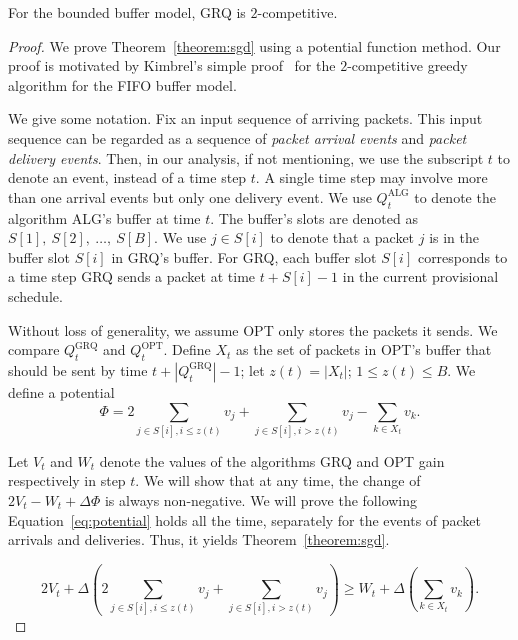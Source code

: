 \documentclass[final, 11pt]{article}
\begin{document}
\begin{theorem}
For the bounded buffer model, GRQ is $2$-competitive.
\label{theorem:sgd}
\end{theorem}

\begin{proof}
We prove Theorem~\ref{theorem:sgd} using a potential function method. Our proof is motivated by Kimbrel's simple proof~\cite{K04} for the $2$-competitive greedy algorithm for the FIFO buffer model.

We give some notation. Fix an input sequence of arriving packets. This input sequence can be regarded as a sequence of {\em packet arrival events} and {\em packet delivery events}. Then, in our analysis, if not mentioning, we use the subscript $t$ to denote an event, instead of a time step $t$. A single time step may involve more than one arrival events but only one delivery event. We use $Q^\text{ALG}_t$ to denote the algorithm ALG's buffer at time $t$. The buffer's slots are denoted as $S[1], \ S[2], \ \ldots, \ S[B]$. We use $j \in S[i]$ to denote that a packet $j$ is in the buffer slot $S[i]$ in GRQ's buffer. For GRQ, each buffer slot $S[i]$ corresponds to a time step GRQ sends a packet at time $t + S[i] - 1$ in the current provisional schedule.

Without loss of generality, we assume OPT only stores the packets it sends. We compare $Q^\text{GRQ}_t$ and $Q^\text{OPT}_t$. Define $X_t$ as the set of packets in OPT's buffer that should be sent by time $t + |Q^\text{GRQ}_t| - 1$; let $z(t) = |X_t|$; $1 \le z(t) \le B$. We define a potential
\begin{equation}
\Phi = 2 \sum_{j \in S[i], i \le z(t)} v_j + \sum_{j \in S[i], i > z(t)} v_j - \sum_{k \in X_t} v_k.
\label{eq:diff}
\end{equation}

Let $V_t$ and $W_t$ denote the values of the algorithms GRQ and OPT gain respectively in step $t$. We will show that at any time, the change of $2 V_t - W_t + \Delta \Phi$ is always non-negative. We will prove the following Equation~\ref{eq:potential} holds all the time, separately for the events of packet arrivals and deliveries. Thus, it yields Theorem~\ref{theorem:sgd}.

\begin{equation}
2 V_t + \Delta (2 \sum_{j \in S[i], i \le z(t)} v_j + \sum_{j \in S[i], i > z(t)} v_j) \ge W_t + \Delta (\sum_{k \in X_t} v_k).
\label{eq:potential}
\end{equation}


\end{proof}
\end{document}
